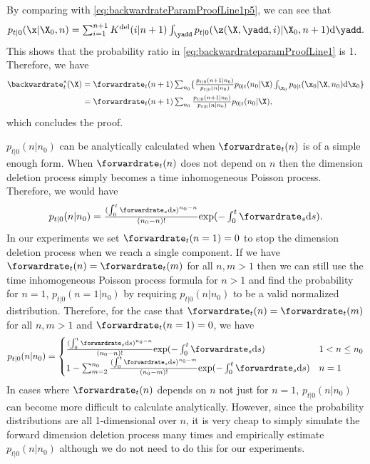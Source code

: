 By comparing with \eqref{eq:backwardrateParamProofLine1p5}, we can see that
\begin{align}
\textstyle     p_{t|0}(\x | \X_0, n) = \sum_{i=1}^{n+1} K^{\text{del}}(i | n+1) \int_{\yadd} p_{t|0}(\z(\X, \yadd, i) | \X_0, n+1) \rmd \yadd . 
\end{align}
This shows that the probability ratio in \eqref{eq:backwardrateparamProofLine1} is 1. Therefore, we have
\begin{align}
       \backwardrate_t^*(\X) &\textstyle = \forwardrate_t(n+1) \sum_{n_0} \{ \frac{p_{t|0}(n+1 | n_0)}{p_{t|0}(n | n_0)} p_{0|t}(n_0 | \X) \int_{\x_0} p_{0|t}(\x_0 | \X, n_0)\rmd \x_0 \}\\
       &\textstyle = \forwardrate_t(n+1) \sum_{n_0} \frac{p_{t|0}(n+1 | n_0)}{p_{t|0}(n | n_0)} p_{0|t}(n_0 | \X) , 
\end{align}
which concludes the proof.

$p_{t|0}(n | n_0)$ can be analytically calculated when $\forwardrate_t(n)$ is of a simple enough form. When $\forwardrate_t(n)$ does not depend on $n$ then the dimension deletion process simply becomes a time inhomogeneous Poisson process. Therefore, we would have
\begin{equation}
\textstyle    p_{t|0}(n | n_0) = \frac{(\int_0^t \forwardrate_s \rmd s)^{n_0 - n}}{(n_0 - n)!} \text{exp}(- \int_0^t \forwardrate_s \rmd s) . 
\end{equation}
In our experiments we set $\forwardrate_t(n=1) = 0$ to stop the dimension deletion process when we reach a single component. If we have $\forwardrate_t(n) = \forwardrate_t(m)$ for all $n, m > 1$ then we can still use the time inhomogeneous Poisson process formula for $n > 1$ and find the probability for $n=1$, $p_{t|0}(n=1 | n_0)$ by requiring $p_{t|0}(n | n_0)$ to be a valid normalized distribution. Therefore, for the case that $\forwardrate_t(n) = \forwardrate_t(m)$ for all $n, m > 1$ and $\forwardrate_t(n=1) = 0$, we have
\begin{equation}
    p_{t|0}(n | n_0) = \begin{cases}
         \frac{(\int_0^t \forwardrate_s \rmd s)^{n_0 - n}}{(n_0 - n)!} \text{exp}(- \int_0^t \forwardrate_s \rmd s)&\textstyle  1 < n \leq n_0 \\
        1 -  \sum_{m=2}^{n_0} \frac{(\int_0^t \forwardrate_s \rmd s)^{n_0 - m}}{(n_0 - m)!} \text{exp}(- \int_0^t \forwardrate_s \rmd s)  &\textstyle  n = 1
    \end{cases}
\end{equation}
In cases where $\forwardrate_t(n)$ depends on $n$ not just for $n=1$, $p_{t|0}(n | n_0)$ can become more difficult to calculate analytically. However, since the probability distributions are all 1-dimensional over $n$, it is very cheap to simply simulate the forward dimension deletion process many times and empirically estimate $p_{t|0}(n | n_0)$ although we do not need to do this for our experiments.








